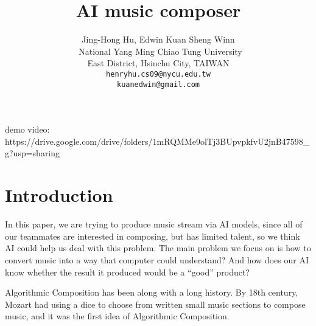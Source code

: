 \documentclass[10pt,twocolumn,letterpaper]{article}
\begin{document}
\title{AI music composer}

\author{Jing-Hong Hu, Edwin Kuan Sheng Winn\\\
National Yang Ming Chiao Tung University\\
East District, Hsinchu City, TAIWAN\\
{\tt\small henryhu.cs09@nycu.edu.tw}\\
{\tt\small kuanedwin@gmail.com}
}
\maketitle

\begin{abstract}
\end{abstract}


demo video: https://drive.google.com/drive/folders/1mRQMMe9olTj3BUpvpkfvU2jnB47598_g?usp=sharing

\section{Introduction}
In this paper, we are trying to produce music stream via AI models, since all of our teammates are interested in composing, but has limited talent, so we think AI could help us deal with this problem. The main problem we focus on is how to convert music into a way that computer could understand? And how does our AI know whether the result it produced would be a “good” product?

Algorithmic Composition has been along with a long history. By 18th century, Mozart had using a dice to choose from written small music sections to compose music, and it was the first idea of Algorithmic Composition.
\end{document}
